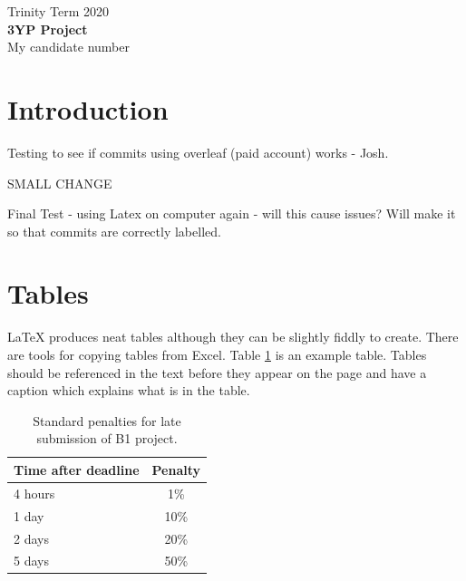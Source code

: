 \documentclass[11pt]{article}
\begin{document}
\begin{center}
\vspace*{2cm}
Trinity Term 2020\\ %
\vspace*{6cm}
 \huge{\textbf{{}3YP Project}}\\ 
\vspace*{6cm}
{\large{My candidate number}} %
\thispagestyle{empty} %


\end{center}

\newpage

\setcounter{page}{1}

\section{Introduction}
Testing to see if commits using overleaf (paid account) works - Josh.

SMALL CHANGE

Final Test - using Latex on computer again - will this cause issues? Will make it so that commits are correctly labelled.




\section{Tables}

\LaTeX{} produces neat tables although they can be slightly fiddly to create. There are tools for copying tables from Excel. Table \ref{tab:latesubpen} is an example table. Tables should be referenced in the text before they appear on the page and have a caption which explains what is in the table.
\begin{table}[h] %
\begin{center}
\begin{tabular}{ |l|c| } 
 \hline
  Time after deadline & Penalty  \\ 
  \hline
 4 hours & 1\%  \\ 
 1 day & 10\%  \\ 
 2 days & 20\%  \\ 
 5 days & 50\%\\
 \hline
\end{tabular}
\end{center}
\label{tab:latesubpen}
\caption{Standard penalties for late submission of B1 project.}
\end{table}
\end{document}
